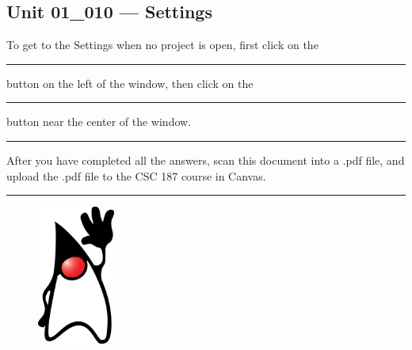 \documentclass[letterpaper,12pt]{exam}
\newcommand{\unit}{Unit 01}
\begin{document}
\begin{questions}

\section*{\unit\_010 --- Settings} %

\begin{samepage}
	\question To get to the Settings when no project is open, first click on the \rule{30mm}{0.15mm} button on the left of the window, then click on the \rule{30mm}{0.15mm} button near the center of the window.
	\vspace{5mm}
\end{samepage}

\end{questions}
\hrule
\vspace{5mm}
\noindent After you have completed all the answers, scan this document into a .pdf file, and upload the .pdf file to the CSC 187 course in Canvas. 
\vspace{5mm}
\hrule

\begin{figure}[b]\label{end}
	\center
	\includegraphics[width=1in]{../duke.png}
\end{figure}
\end{document}
